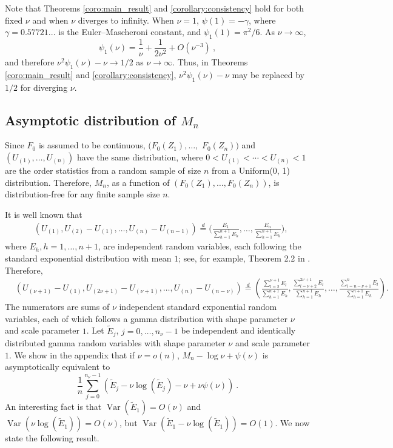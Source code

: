 \documentclass[12pt,letterpaper, twoside, openany]{article}
\DeclareMathOperator*{\Var}{Var}
\theoremstyle{plain}
\begin{document}
Note that Theorems \ref{coro:main_result} and \ref{corollary:consistency} hold for both fixed $\nu$ and when $\nu$ diverges to infinity.  When $\nu=1$, $\psi(1)=-\gamma$, where $\gamma=0.57721...$ is the Euler--Mascheroni constant, and $\psi_1(1)=\pi^2/6$.  As $\nu\to \infty$, 
\begin{equation*}
\psi_1(\nu) = \frac{1}{\nu} + \frac{1}{2\nu^2} + O(\nu^{-3}) \ ,
\end{equation*}
and therefore $\nu^2 \psi_1(\nu) - \nu \rightarrow 1/2$ as $\nu \rightarrow \infty$. Thus, in Theorems \ref{coro:main_result} and \ref{corollary:consistency}, $\nu^2 \psi_1(\nu) - \nu$ may be replaced  by $1/2$ for diverging $\nu$.

\subsection{Asymptotic distribution of $M_n$}\label{sect:spacings}
Since $F_0$ is assumed to be continuous, $(F_0(Z_1),\ldots,$ $F_0(Z_n))$ and $(U_{(1)},\ldots,U_{(n)})$ have the same distribution, where $0<U_{(1)}<\cdots<U_{(n)}<1$ are the order statistics from a random sample of size $n$ from a Uniform(0, 1) distribution. Therefore, $M_n$, as a function of $(F_0(Z_1), \ldots, F_0(Z_n))$, is distribution-free for any finite sample size $n$. 

It is well known that 
\begin{align*}
		&(U_{(1)}, U_{(2)} - U_{(1)},\ldots, U_{(n)} - U_{(n-1)} ) 
  \stackrel{d}{=}\bigg( \frac{E_1}{\sum^{n+1}_{h=1} E_h}, \ldots, \frac{E_n}{\sum^{n+1}_{h=1} E_h}\bigg), 
	\end{align*}
	where $E_h, h=1,\ldots,n+1$, are independent random variables, each following the standard exponential distribution with mean $1$; see, for example, Theorem 2.2 in \cite{Devroye1986}.  Therefore, 
 \begin{align*}
  & (U_{(\nu+1)} - U_{(1)}, U_{(2\nu+1)} - U_{(\nu+1)}, \ldots, U_{(n)} - U_{(n-\nu)})
    \stackrel{d}{=} \left(\frac{ \sum^{\nu+1}_{l=2}E_l}{\sum^{n+1}_{h=1}E_h}, \frac{\sum^{2\nu+1}_{l=\nu+2}E_l}{\sum^{n+1}_{h=1}E_h },\ldots, 
    \frac{\sum^{n}_{l=n-\nu+1}E_l}{\sum^{n+1}_{h=1}E_h } \right).
\end{align*}
The numerators are sums of $\nu$ independent standard exponential random variables, each of which follows a gamma distribution with shape parameter $\nu$ and scale parameter $1$.  Let $\tilde{E}_j$, $j=0,\ldots,n_{\nu}-1$ be independent and identically distributed gamma random variables with shape parameter $\nu$ and scale parameter $1$.  We show in the appendix that if $\nu=o(n)$, $M_n-\log \nu+\psi(\nu)$ is asymptotically equivalent to 
\[
\frac{1}{n}\sum_{j=0}^{n_{\nu} - 1} (\tilde{E}_j-
\nu\log(\tilde{E}_j)-\nu+\nu\psi(\nu)) \ .
\]
An interesting fact is that $\Var(\tilde{E}_1)=O(\nu)$ and $\Var(\nu \log(\tilde{E}_1))=O(\nu)$, but $\Var(\tilde{E}_1-\nu \log(\tilde{E}_1))=O(1)$.  We now state the following result.
\end{document}
